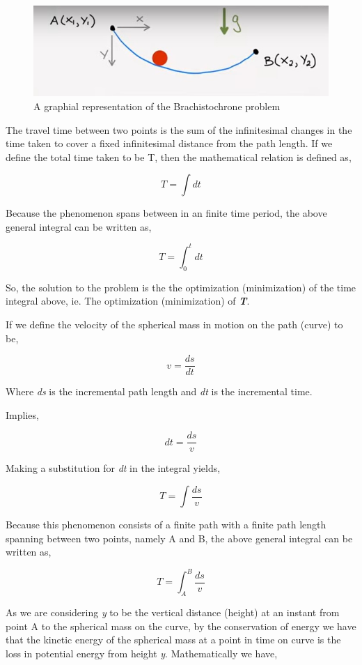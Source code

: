 

\begin{figure}[H]
\centering
\includegraphics[width=15cm]{BrachPoints.jpg}
    		\caption{{A graphial representation of the Brachistochrone problem}}
\end{figure}


{The travel time between two points is the sum of the infinitesimal changes in the time taken to cover a fixed infinitesimal distance from the path length. If we define the total time taken to be T, then the mathematical relation is defined as,}

	$$T = \int dt$$

{Because the phenomenon spans between in an finite time period, the above general integral can be written as,}

	$$T = \int_{0}^{t} dt$$

{So, the solution to the problem is the the optimization (minimization) of the time integral above, ie. The optimization (minimization) of \textit{\textbf{T}}.}

{If we define the velocity of the spherical mass in motion on the path (curve) to be,}

	$$v = \frac{ds}{dt}$$

{Where \textit{ds} is the incremental path length and \textit{dt} is the incremental time.}

{Implies,}

	$$dt = \frac{ds}{v}$$

{Making a substitution for \textit{dt} in the integral yields,}

	$$T = \int \frac{ds}{v}$$

{Because this phenomenon consists of a finite path with a finite path length spanning between two points, namely A and B, the above general integral can be written as,}

	\begin{equation}
		T = \int_{A}^{B} \frac{ds}{v}
		\label{T-ab}
	\end{equation}

{As we are considering \textit{y} to be the vertical distance (height) at an instant from point A to the spherical mass on the curve, by the conservation of energy we have that the kinetic energy of the spherical mass at a point in time on curve is the loss in potential energy from height \textit{y}. Mathematically we have,}

